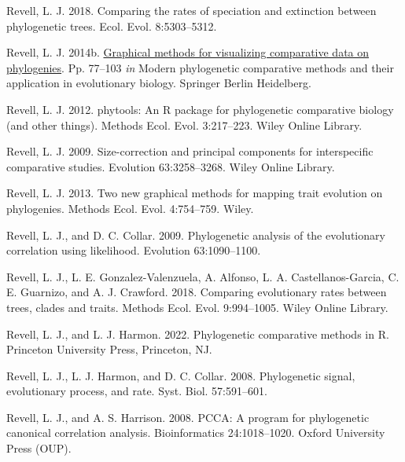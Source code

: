 \documentclass[fleqn,10pt,lineno]{wlpeerj} %
\newlength{\cslhangindent}
\newlength{\cslentryspacingunit} %
\newenvironment{CSLReferences}[2] %
 {%
  \setlength{\parindent}{0pt}
  \ifodd #1
  \let\oldpar\par
  \def\par{\hangindent=\cslhangindent\oldpar}
  \fi
  \setlength{\parskip}{#2\cslentryspacingunit}
 }%
 {}
\begin{document}
\begin{CSLReferences}{1}{0}
\leavevmode{}%
Revell, L. J. 2018. Comparing the rates of speciation and extinction between phylogenetic trees. Ecol. Evol. 8:5303--5312.

\leavevmode{}%
Revell, L. J. 2014b. \href{https://doi.org/10.1007/978-3-662-43550-2_4}{Graphical methods for visualizing comparative data on phylogenies}. Pp. 77--103 \emph{in} Modern phylogenetic comparative methods and their application in evolutionary biology. Springer Berlin Heidelberg.

\leavevmode{}%
Revell, L. J. 2012. {phytools}: An {R} package for phylogenetic comparative biology (and other things). Methods Ecol. Evol. 3:217--223. Wiley Online Library.

\leavevmode{}%
Revell, L. J. 2009. Size-correction and principal components for interspecific comparative studies. Evolution 63:3258--3268. Wiley Online Library.

\leavevmode{}%
Revell, L. J. 2013. Two new graphical methods for mapping trait evolution on phylogenies. Methods Ecol. Evol. 4:754--759. Wiley.

\leavevmode{}%
Revell, L. J., and D. C. Collar. 2009. Phylogenetic analysis of the evolutionary correlation using likelihood. Evolution 63:1090--1100.

\leavevmode{}%
Revell, L. J., L. E. Gonzalez-Valenzuela, A. Alfonso, L. A. Castellanos-Garcia, C. E. Guarnizo, and A. J. Crawford. 2018. Comparing evolutionary rates between trees, clades and traits. Methods Ecol. Evol. 9:994--1005. Wiley Online Library.

\leavevmode{}%
Revell, L. J., and L. J. Harmon. 2022. Phylogenetic comparative methods in {R}. Princeton University Press, Princeton, NJ.

\leavevmode{}%
Revell, L. J., L. J. Harmon, and D. C. Collar. 2008. Phylogenetic signal, evolutionary process, and rate. Syst. Biol. 57:591--601.

\leavevmode{}%
Revell, L. J., and A. S. Harrison. 2008. {PCCA}: A program for phylogenetic canonical correlation analysis. Bioinformatics 24:1018--1020. Oxford University Press (OUP).


\end{CSLReferences}
\end{document}
